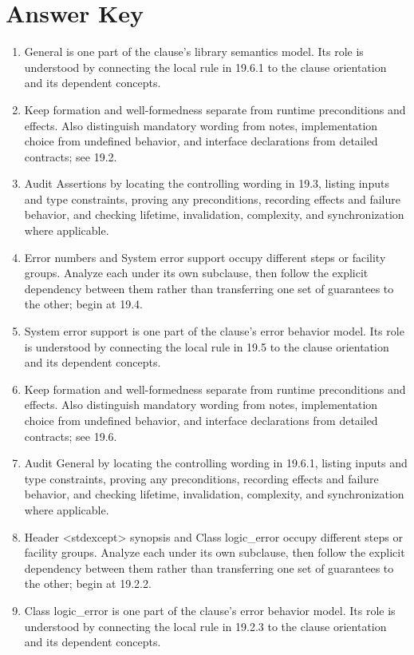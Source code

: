 \documentclass[11pt,letterpaper]{article}
\begin{document}
\clearpage\section{Answer Key}
\begin{enumerate}
\item General is one part of the clause's library semantics model. Its role is understood by connecting the local rule in 19.6.1 to the clause orientation and its dependent concepts.
\item Keep formation and well-formedness separate from runtime preconditions and effects. Also distinguish mandatory wording from notes, implementation choice from undefined behavior, and interface declarations from detailed contracts; see 19.2.
\item Audit Assertions by locating the controlling wording in 19.3, listing inputs and type constraints, proving any preconditions, recording effects and failure behavior, and checking lifetime, invalidation, complexity, and synchronization where applicable.
\item Error numbers and System error support occupy different steps or facility groups. Analyze each under its own subclause, then follow the explicit dependency between them rather than transferring one set of guarantees to the other; begin at 19.4.
\item System error support is one part of the clause's error behavior model. Its role is understood by connecting the local rule in 19.5 to the clause orientation and its dependent concepts.
\item Keep formation and well-formedness separate from runtime preconditions and effects. Also distinguish mandatory wording from notes, implementation choice from undefined behavior, and interface declarations from detailed contracts; see 19.6.
\item Audit General by locating the controlling wording in 19.6.1, listing inputs and type constraints, proving any preconditions, recording effects and failure behavior, and checking lifetime, invalidation, complexity, and synchronization where applicable.
\item Header <stdexcept> synopsis and Class logic\_\allowbreak{}error occupy different steps or facility groups. Analyze each under its own subclause, then follow the explicit dependency between them rather than transferring one set of guarantees to the other; begin at 19.2.2.
\item Class logic\_\allowbreak{}error is one part of the clause's error behavior model. Its role is understood by connecting the local rule in 19.2.3 to the clause orientation and its dependent concepts.

\end{enumerate}
\end{document}
